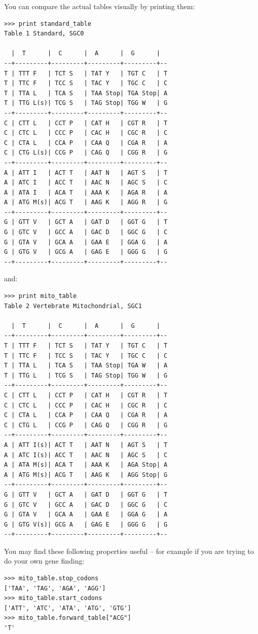 \documentclass{report}
\begin{document}
You can compare the actual tables visually by printing them:
\begin{verbatim}
>>> print standard_table
Table 1 Standard, SGC0

  |  T      |  C      |  A      |  G      |
--+---------+---------+---------+---------+--
T | TTT F   | TCT S   | TAT Y   | TGT C   | T
T | TTC F   | TCC S   | TAC Y   | TGC C   | C
T | TTA L   | TCA S   | TAA Stop| TGA Stop| A
T | TTG L(s)| TCG S   | TAG Stop| TGG W   | G
--+---------+---------+---------+---------+--
C | CTT L   | CCT P   | CAT H   | CGT R   | T
C | CTC L   | CCC P   | CAC H   | CGC R   | C
C | CTA L   | CCA P   | CAA Q   | CGA R   | A
C | CTG L(s)| CCG P   | CAG Q   | CGG R   | G
--+---------+---------+---------+---------+--
A | ATT I   | ACT T   | AAT N   | AGT S   | T
A | ATC I   | ACC T   | AAC N   | AGC S   | C
A | ATA I   | ACA T   | AAA K   | AGA R   | A
A | ATG M(s)| ACG T   | AAG K   | AGG R   | G
--+---------+---------+---------+---------+--
G | GTT V   | GCT A   | GAT D   | GGT G   | T
G | GTC V   | GCC A   | GAC D   | GGC G   | C
G | GTA V   | GCA A   | GAA E   | GGA G   | A
G | GTG V   | GCG A   | GAG E   | GGG G   | G
--+---------+---------+---------+---------+--
\end{verbatim}
\noindent and:
\begin{verbatim}
>>> print mito_table
Table 2 Vertebrate Mitochondrial, SGC1

  |  T      |  C      |  A      |  G      |
--+---------+---------+---------+---------+--
T | TTT F   | TCT S   | TAT Y   | TGT C   | T
T | TTC F   | TCC S   | TAC Y   | TGC C   | C
T | TTA L   | TCA S   | TAA Stop| TGA W   | A
T | TTG L   | TCG S   | TAG Stop| TGG W   | G
--+---------+---------+---------+---------+--
C | CTT L   | CCT P   | CAT H   | CGT R   | T
C | CTC L   | CCC P   | CAC H   | CGC R   | C
C | CTA L   | CCA P   | CAA Q   | CGA R   | A
C | CTG L   | CCG P   | CAG Q   | CGG R   | G
--+---------+---------+---------+---------+--
A | ATT I(s)| ACT T   | AAT N   | AGT S   | T
A | ATC I(s)| ACC T   | AAC N   | AGC S   | C
A | ATA M(s)| ACA T   | AAA K   | AGA Stop| A
A | ATG M(s)| ACG T   | AAG K   | AGG Stop| G
--+---------+---------+---------+---------+--
G | GTT V   | GCT A   | GAT D   | GGT G   | T
G | GTC V   | GCC A   | GAC D   | GGC G   | C
G | GTA V   | GCA A   | GAA E   | GGA G   | A
G | GTG V(s)| GCG A   | GAG E   | GGG G   | G
--+---------+---------+---------+---------+--
\end{verbatim}

You may find these following properties useful -- for example if you are trying
to do your own gene finding:
\begin{verbatim}
>>> mito_table.stop_codons
['TAA', 'TAG', 'AGA', 'AGG']
>>> mito_table.start_codons
['ATT', 'ATC', 'ATA', 'ATG', 'GTG']
>>> mito_table.forward_table["ACG"]
'T'
\end{verbatim}
\end{document}
